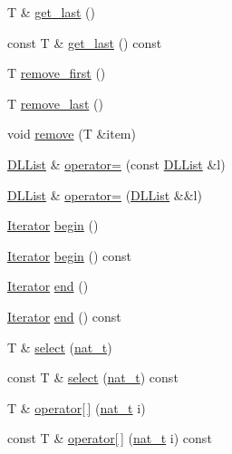 \begin{DoxyCompactItemize}
T \& \hyperlink{class_designar_1_1_d_l_list_a94c9be82f4ec5a3579e84027c421e073}{get\+\_\+last} ()
\item 
const T \& \hyperlink{class_designar_1_1_d_l_list_aae2cd78c744f82ece725c9d21a02d4da}{get\+\_\+last} () const
\item 
T \hyperlink{class_designar_1_1_d_l_list_a62e4c39df6ba191e7cd8dadac70109fb}{remove\+\_\+first} ()
\item 
T \hyperlink{class_designar_1_1_d_l_list_ac64bdba91bd7ff758fbb0e29f50dadcd}{remove\+\_\+last} ()
\item 
void \hyperlink{class_designar_1_1_d_l_list_a6fd7f99c303dc6897a72dabd5f1f943d}{remove} (T \&item)
\item 
\hyperlink{class_designar_1_1_d_l_list}{D\+L\+List} \& \hyperlink{class_designar_1_1_d_l_list_a3fda59e4bde20b86ee0cc0f083fc5f3a}{operator=} (const \hyperlink{class_designar_1_1_d_l_list}{D\+L\+List} \&l)
\item 
\hyperlink{class_designar_1_1_d_l_list}{D\+L\+List} \& \hyperlink{class_designar_1_1_d_l_list_a4c8c2df2e049fbbbfea113ae43365ff0}{operator=} (\hyperlink{class_designar_1_1_d_l_list}{D\+L\+List} \&\&l)
\item 
\hyperlink{class_designar_1_1_d_l_list_1_1_iterator}{Iterator} \hyperlink{class_designar_1_1_d_l_list_a1c011ca480554788280073fcdf6804c6}{begin} ()
\item 
\hyperlink{class_designar_1_1_d_l_list_1_1_iterator}{Iterator} \hyperlink{class_designar_1_1_d_l_list_a5fa0fa23f4ab881a04be6786de312dad}{begin} () const
\item 
\hyperlink{class_designar_1_1_d_l_list_1_1_iterator}{Iterator} \hyperlink{class_designar_1_1_d_l_list_afa49470cd57bc800bfa95c00cebb4c08}{end} ()
\item 
\hyperlink{class_designar_1_1_d_l_list_1_1_iterator}{Iterator} \hyperlink{class_designar_1_1_d_l_list_a44bec24be9eb3b3bbfeadc28240a1650}{end} () const
\item 
T \& \hyperlink{class_designar_1_1_d_l_list_abb57692be6aa79d00b65e40cd8402621}{select} (\hyperlink{namespace_designar_aa72662848b9f4815e7bf31a7cf3e33d1}{nat\+\_\+t})
\item 
const T \& \hyperlink{class_designar_1_1_d_l_list_a7060ef1496f583a3d4ed64b8ffdb94c8}{select} (\hyperlink{namespace_designar_aa72662848b9f4815e7bf31a7cf3e33d1}{nat\+\_\+t}) const
\item 
T \& \hyperlink{class_designar_1_1_d_l_list_aeb63bb4da91b7f1aed9a32de679122df}{operator\mbox{[}$\,$\mbox{]}} (\hyperlink{namespace_designar_aa72662848b9f4815e7bf31a7cf3e33d1}{nat\+\_\+t} i)
\item 
const T \& \hyperlink{class_designar_1_1_d_l_list_a24b5b31952821f0d40fef5326ba635b3}{operator\mbox{[}$\,$\mbox{]}} (\hyperlink{namespace_designar_aa72662848b9f4815e7bf31a7cf3e33d1}{nat\+\_\+t} i) const
\end{DoxyCompactItemize}


